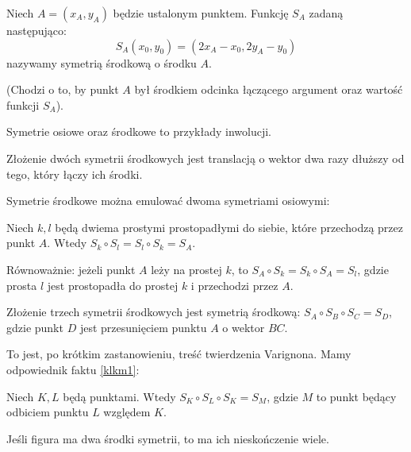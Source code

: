 
\begin{definition}
    Niech $A = (x_A, y_A)$ będzie ustalonym punktem.
    Funkcję $S_A$ zadaną następująco:
    \begin{equation}
        S_A(x_0, y_0) = (2x_A - x_0, 2y_A - y_0)
    \end{equation}
    nazywamy symetrią środkową o środku $A$.
\end{definition}

(Chodzi o to, by punkt $A$ był środkiem odcinka łączącego argument oraz wartość funkcji $S_A$).

\begin{example}
    Symetrie osiowe oraz środkowe to przykłady inwolucji.
\end{example}

\begin{proposition}
    Złożenie dwóch symetrii środkowych jest translacją o wektor dwa razy dłuższy od tego, który łączy ich środki.
\end{proposition}

Symetrie środkowe można emulować dwoma symetriami osiowymi:

\begin{proposition}
\label{two_axial_one_point}
    Niech $k, l$ będą dwiema prostymi prostopadłymi do siebie, które przechodzą przez punkt $A$.
    Wtedy $S_k \circ S_l = S_l \circ S_k = S_A$.
\end{proposition}

Równoważnie: jeżeli punkt $A$ leży na prostej $k$, to $S_A \circ S_k = S_k \circ S_A = S_l$, gdzie prosta $l$ jest prostopadła do prostej $k$ i przechodzi przez $A$.

\begin{proposition}
    Złożenie trzech symetrii środkowych jest symetrią środkową: $S_A \circ S_B \circ S_C = S_D$, gdzie punkt $D$ jest przesunięciem punktu $A$ o wektor $BC$.
\end{proposition}

To jest, po krótkim zastanowieniu, treść twierdzenia Varignona.
%
Mamy odpowiednik faktu \ref{klkm1}:

\begin{proposition}
\label{klkm2}
    Niech $K, L$ będą punktami.
    Wtedy $S_K \circ S_L \circ S_K = S_M$, gdzie $M$ to punkt będący odbiciem punktu $L$ względem $K$.
\end{proposition}

Jeśli figura ma dwa środki symetrii, to ma ich nieskończenie wiele.

%